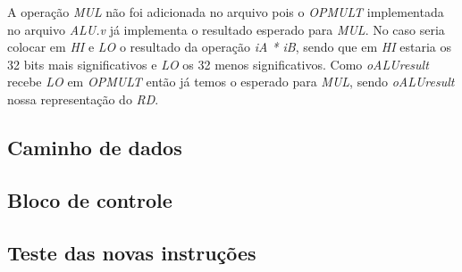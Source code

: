 \documentclass[12pt]{article}
\begin{document}
A operação \textit{MUL} não foi adicionada no arquivo pois o \textit{OPMULT} implementada no arquivo \textit{ALU.v} já implementa o resultado esperado para \textit{MUL}. No caso seria colocar em \textit{HI} e \textit{LO} o resultado da operação \textit{iA * iB}, sendo que em \textit{HI} estaria os 32 bits mais significativos e \textit{LO} os 32 menos significativos. Como \textit{oALUresult} recebe \textit{LO} em \textit{OPMULT} então já temos o esperado para \textit{MUL}, sendo \textit{oALUresult} nossa representação do \textit{RD}.

\subsection{Caminho de dados}
\label{subsec:datapath}

\subsection{Bloco de controle}
\label{subsec:control}

\subsection{Teste das novas instruções}
\label{subsec:testeisa}



\end{document}
